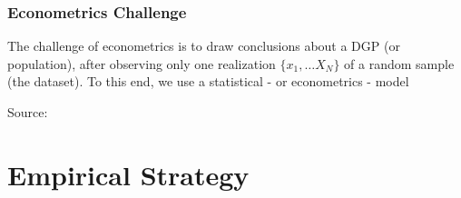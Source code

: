 \documentclass{beamer}
\begin{document}
\begin{frame}
  \frametitle{Econometrics Challenge}
  The challenge of econometrics is to draw conclusions about a DGP (or population), after observing only one realization $\{x_1, \dots X_N\}$ of a random sample (the dataset). To this end, we use a statistical - or econometrics - model\\

\medskip
  
    \hspace*{15pt}\hbox{\scriptsize Source:}
    
\end{frame}


\section{Empirical Strategy}
\end{document}
